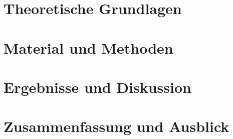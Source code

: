 \documentclass[%
	BCOR12mm, %
	cleardoublepage=empty, %
	tablecaptionabove, %
	toc=bib, %
	toc=listofnumbered, %
	listof=leveldown, %
	numbers=noendperiod %
	]{scrbook}
\renewcommand\appendix{\par
	\addchap{\appendixname}
	\setcounter{section}{0}%
	\setcounter{subsection}{0}%
	\setcounter{figure}{0}%
	\renewcommand\thesection{\Alph{section}}%
	\renewcommand\thefigure{\Alph{section}.\arabic{figure}} 
	\renewcommand\thetable{\Alph{section}.\arabic{table}}}
\begin{document}
\chapter{Theoretische Grundlagen} %
\label{cha:theoretische_grundlagen}
\cite{pradipasena2007temperature}


\citep{gaukel2004untersuchungen}

\citet{young1957d}

\chapter{Material und Methoden} %
\label{cha:material_und_methoden}


\chapter{Ergebnisse und Diskussion} %
\label{cha:ergebnisse_und_diskussion}


\chapter{Zusammenfassung und Ausblick} %
\label{cha:zusammenfassung_und_ausblick}





\appendix

\listoffigures

\listoftables
\end{document}
